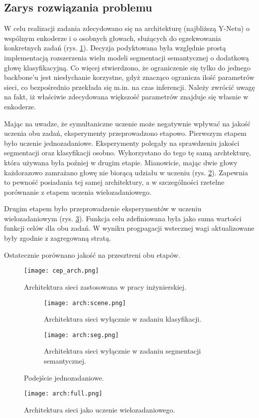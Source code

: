 \subsection{Zarys rozwiązania problemu}
W celu realizacji zadania zdecydowano się na architekturę (najbliższą Y-Netu) o wspólnym enkoderze i o osobnych głowach, służących do egzekwowania konkretnych zadań (rys. \ref{fig:cep_arch}). Decyzja podyktowana była względnie prostą implementacją rozszerzenia wielu modeli segmentacji semantycznej o dodatkową głowę klasyfikacyjną. Co więcej stwierdzono, że ograniczenie się tylko do jednego backbone'u jest niesłychanie korzystne, gdyż znacząco ogranicza ilość parametrów sieci, co bezpośrednio przekłada się m.in. na czas inferencji. Należy zwrócić uwagę na fakt, iż właściwie zdecydowana większość parametrów znajduje się własnie w enkoderze.

Mając na uwadze, że symultaniczne uczenie może negatywnie wpływać na jakość uczenia obu zadań, eksperymenty przeprowadzono etapowo. Pierwszym etapem było uczenie jednozadaniowe. Eksperymenty polegały na sprawdzeniu jakości segmentacji oraz klasyfikacji osobno. Wykorzystano do tego tę samą archtekturę, która używana była poźniej w drugim etapie. Mianowicie, mając dwie głowy każdorazowo zamrażano głowę nie biorącą udziału w uczeniu (rys. \ref{fig:arch-scene-seg}). Zapewnia to pewność posiadania tej samej architektury, a w szczególności rzetelne porównanie z etapem uczenia wielozadaniowego.

Drugim etapem było przeprowadzenie eksperymentów w uczeniu wielozadaniowym (rys. \ref{fig:arch-full}). Funkcja celu zdefiniowana była jako suma wartości funkcji celów dla obu zadań. W wyniku progpagacji wstecznej wagi aktualizowane były zgodnie z zagregowaną stratą.

Ostatecznie porównano jakość na przesztreni obu etapów.

\begin{figure}[ht!]
    \centering
    \texttt{[image: cep\_arch.png]}
    \caption{Architektura sieci zastosowana w pracy inżynierskiej.}
    \label{fig:cep_arch}
\end{figure}

\begin{figure}[ht!]
    \centering
    \begin{subfigure}[b]{0.49\textwidth}
        \centering
        \texttt{[image: arch:scene.png]}
        \caption{Architektura sieci wyłącznie w zadaniu klasyfikacji.}
    \end{subfigure}
    \hfill
    \begin{subfigure}[b]{0.49\textwidth}
        \centering
        \texttt{[image: arch:seg.png]}
        \caption{Architektura sieci wyłącznie w zadaniu segmentacji semantycznej.}
    \end{subfigure}
    \caption[]{Podejście jednozadaniowe.}
    \label{fig:arch-scene-seg}
\end{figure}

\begin{figure}[ht!]
    \centering
    \texttt{[image: arch:full.png]}
    \caption{Architektura sieci jako uczenie wielozadaniowego.}
    \label{fig:arch-full}
\end{figure}